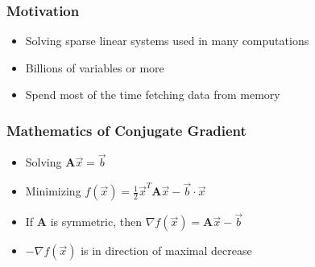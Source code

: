 \documentclass{beamer}
\title{}
\subtitle{All-College Thesis Defense}
\author{\textbf{Neil Lindquist}}
\date{April 16th, 2019}
\newcommand{\mat}[1]{\mathbf{#1}}
\begin{document}
\begin{frame}
	\titlepage
\end{frame}

\begin{frame}
	\frametitle{Motivation}
	\begin{itemize}
		\item Solving sparse linear systems used in many computations
		\item Billions of variables or more
		\item Spend most of the time fetching data from memory
	\end{itemize}
\end{frame}

\begin{frame}
	\frametitle{Mathematics of Conjugate Gradient}
	\begin{itemize}
		\item Solving \(\mat{A}\vec{x} = \vec{b}\)
		\pause
		\item Minimizing \(f(\vec{x}) = \tfrac{1}{2}\vec{x}^T\mat{A}\vec{x}-\vec{b}\cdot\vec{x}\)
		\pause
		\item If \(\mat{A}\) is symmetric, then \(\nabla f(\vec{x}) = \mat{A}\vec{x} - \vec{b}\)
		\pause
		\item \(-\nabla f(\vec{x})\) is in direction of maximal decrease
	\end{itemize}
\end{frame}
\end{document}
